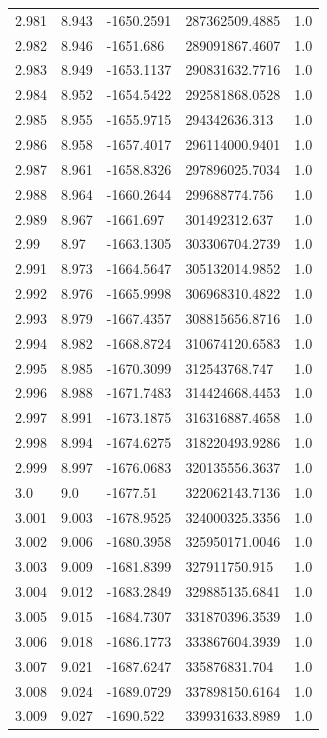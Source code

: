 \begin{tabular}{lllll}
2.981 & 8.943 & -1650.2591 & 287362509.4885 & 1.0 \\
2.982 & 8.946 & -1651.686 & 289091867.4607 & 1.0 \\
2.983 & 8.949 & -1653.1137 & 290831632.7716 & 1.0 \\
2.984 & 8.952 & -1654.5422 & 292581868.0528 & 1.0 \\
2.985 & 8.955 & -1655.9715 & 294342636.313 & 1.0 \\
2.986 & 8.958 & -1657.4017 & 296114000.9401 & 1.0 \\
2.987 & 8.961 & -1658.8326 & 297896025.7034 & 1.0 \\
2.988 & 8.964 & -1660.2644 & 299688774.756 & 1.0 \\
2.989 & 8.967 & -1661.697 & 301492312.637 & 1.0 \\
2.99 & 8.97 & -1663.1305 & 303306704.2739 & 1.0 \\
2.991 & 8.973 & -1664.5647 & 305132014.9852 & 1.0 \\
2.992 & 8.976 & -1665.9998 & 306968310.4822 & 1.0 \\
2.993 & 8.979 & -1667.4357 & 308815656.8716 & 1.0 \\
2.994 & 8.982 & -1668.8724 & 310674120.6583 & 1.0 \\
2.995 & 8.985 & -1670.3099 & 312543768.747 & 1.0 \\
2.996 & 8.988 & -1671.7483 & 314424668.4453 & 1.0 \\
2.997 & 8.991 & -1673.1875 & 316316887.4658 & 1.0 \\
2.998 & 8.994 & -1674.6275 & 318220493.9286 & 1.0 \\
2.999 & 8.997 & -1676.0683 & 320135556.3637 & 1.0 \\
3.0 & 9.0 & -1677.51 & 322062143.7136 & 1.0 \\
3.001 & 9.003 & -1678.9525 & 324000325.3356 & 1.0 \\
3.002 & 9.006 & -1680.3958 & 325950171.0046 & 1.0 \\
3.003 & 9.009 & -1681.8399 & 327911750.915 & 1.0 \\
3.004 & 9.012 & -1683.2849 & 329885135.6841 & 1.0 \\
3.005 & 9.015 & -1684.7307 & 331870396.3539 & 1.0 \\
3.006 & 9.018 & -1686.1773 & 333867604.3939 & 1.0 \\
3.007 & 9.021 & -1687.6247 & 335876831.704 & 1.0 \\
3.008 & 9.024 & -1689.0729 & 337898150.6164 & 1.0 \\
3.009 & 9.027 & -1690.522 & 339931633.8989 & 1.0 \\

\end{tabular}
